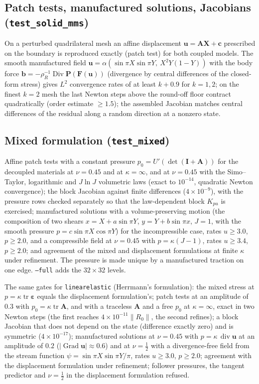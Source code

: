 \documentclass[11pt]{article}
\newcommand{\Grad}{\operatorname{Grad}}
\newcommand{\Dive}{\operatorname{Div}}
\newcommand{\dive}{\operatorname{div}}
\newcommand{\beps}{\bm{\varepsilon}}
\newcommand{\tr}{\operatorname{tr}}
\newcommand{\bX}{\bm{X}}
\newcommand{\bu}{\bm{u}}
\newcommand{\bP}{\bm{P}}
\newcommand{\bF}{\bm{F}}
\newcommand{\bI}{\bm{I}}
\newcommand{\bb}{\bm{b}}
\DeclareRobustCommand{\code}[1]{{\def\_{\textunderscore\allowbreak}\texttt{#1}}}
\begin{document}
\subsection{Patch tests, manufactured solutions, Jacobians (\texttt{test\_solid\_mms})}
On a perturbed quadrilateral mesh an affine displacement $\bu = \bm A\bX + \bm c$
prescribed on the boundary is reproduced exactly (patch test) for both
coupled models.  The smooth manufactured field
$\bu = \alpha(\sin\pi X\sin\pi Y,\ X^2Y(1-Y))$ with the body force
$\bb = -\rho_R^{-1}\Dive\bP(\bF(\bu))$ (divergence by central differences of
the closed-form stress) gives $L^2$ convergence rates of at least
$k + 0.9$ for $k = 1, 2$; on the finest $k = 2$ mesh the last Newton steps
above the round-off floor contract quadratically (order estimate
$\ge 1.5$); the assembled Jacobian matches central differences of the
residual along a random direction at a nonzero state.

\subsection{Mixed formulation (\texttt{test\_mixed})}
Affine patch tests with a constant pressure $p_0 = U'(\det(\bI + \bm A))$
for the decoupled materials at $\nu = 0.45$ and at $\kappa = \infty$, and
at $\nu = 0.45$ with the Simo--Taylor, logarithmic and $J\ln J$ volumetric
laws (exact to $10^{-14}$, quadratic Newton convergence); the block
Jacobian against finite differences ($4\times10^{-9}$), with the pressure
rows checked separately so that the law-dependent block $K_{pu}$ is
exercised; manufactured
solutions with a volume-preserving motion (the composition of two shears
$x = X + a\sin\pi Y$, $y = Y + b\sin\pi x$, $J = 1$, with the smooth
pressure $p = c\sin\pi X\cos\pi Y$) for the incompressible case, rates
$u \ge 3.0$, $p \ge 2.0$, and a compressible field at $\nu = 0.45$ with
$p = \kappa(J-1)$, rates $u \ge 3.4$, $p \ge 2.0$; and agreement of the
mixed and displacement formulations at finite $\kappa$ under refinement.
The pressure is made unique by a manufactured traction on one edge.
\code{--full} adds the $32\times32$ levels.

The same gates for \code{linear\_elastic} (Herrmann's formulation): the
mixed stress at $p = \kappa\tr\beps$ equals the displacement formulation's;
patch tests at an amplitude of $0.3$ with $p_0 = \kappa\tr\bm A$, and with a
traceless $\bm A$ and a free $p_0$ at $\kappa = \infty$, exact in two Newton
steps (the first reaches $4\times10^{-11}\|R_0\|$, the second refines); a
block Jacobian that does not depend on the state (difference exactly zero)
and is symmetric ($4\times10^{-17}$); manufactured solutions at
$\nu = 0.45$ with $p = \kappa\,\dive\bu$ at an amplitude of $0.2$
($|\Grad\bu| \approx 0.6$) and at $\nu = \tfrac12$ with a divergence-free field
from the stream function $\psi = \sin\pi X\sin\pi Y/\pi$, rates
$u \ge 3.0$, $p \ge 2.0$; agreement with the displacement formulation under
refinement; follower pressures, the tangent predictor and $\nu = \tfrac12$
in the displacement formulation refused.
\end{document}
